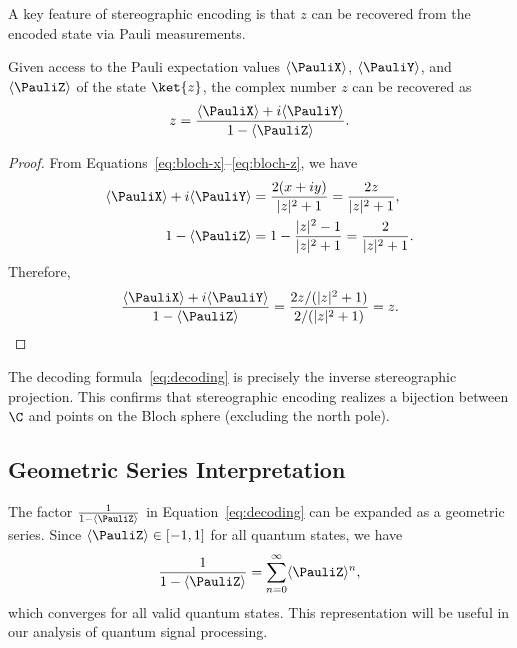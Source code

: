 A key feature of stereographic encoding is that $z$ can be recovered from the encoded state via Pauli measurements.

\begin{theorem}
\label{thm:decoding}
Given access to the Pauli expectation values $\langle \PauliX \rangle$, $\langle \PauliY \rangle$, and $\langle \PauliZ \rangle$ of the state $\ket{z}$, the complex number $z$ can be recovered as
\begin{equation}
    \label{eq:decoding}
    z = \frac{\langle \PauliX \rangle + i\langle \PauliY \rangle}{1 - \langle \PauliZ \rangle}.
\end{equation}
\end{theorem}

\begin{proof}
From Equations~\eqref{eq:bloch-x}--\eqref{eq:bloch-z}, we have
\begin{align}
    \langle \PauliX \rangle + i\langle \PauliY \rangle &= \frac{2(x + iy)}{|z|^2 + 1} = \frac{2z}{|z|^2 + 1}, \\
    1 - \langle \PauliZ \rangle &= 1 - \frac{|z|^2 - 1}{|z|^2 + 1} = \frac{2}{|z|^2 + 1}.
\end{align}
Therefore,
\begin{equation}
    \frac{\langle \PauliX \rangle + i\langle \PauliY \rangle}{1 - \langle \PauliZ \rangle} = \frac{2z/(|z|^2+1)}{2/(|z|^2+1)} = z.
\end{equation}
\end{proof}

\begin{remark}
The decoding formula~\eqref{eq:decoding} is precisely the inverse stereographic projection. This confirms that stereographic encoding realizes a bijection between $\C$ and points on the Bloch sphere (excluding the north pole).
\end{remark}

\subsection{Geometric Series Interpretation}

The factor $\frac{1}{1 - \langle \PauliZ \rangle}$ in Equation~\eqref{eq:decoding} can be expanded as a geometric series. Since $\langle \PauliZ \rangle \in [-1, 1]$ for all quantum states, we have
\begin{equation}
    \label{eq:geometric-series}
    \frac{1}{1 - \langle \PauliZ \rangle} = \sum_{n=0}^{\infty} \langle \PauliZ \rangle^n,
\end{equation}
which converges for all valid quantum states. This representation will be useful in our analysis of quantum signal processing.

